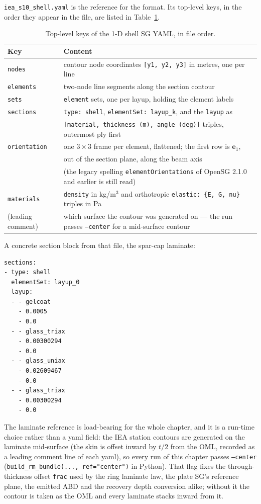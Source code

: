 \texttt{iea\_s10\_shell.yaml} is the reference for the format. Its top-level
keys, in the order they appear in the file, are listed in
Table~\ref{tab:windio:yamlkeys}.

\begin{table}[htbp]
\centering
\small
\caption{Top-level keys of the 1-D shell SG YAML, in file order.}
\label{tab:windio:yamlkeys}
\begin{tabular}{ll}
\toprule
Key & Content \\
\midrule
\texttt{nodes} & contour node coordinates \texttt{[y1, y2, y3]} in metres, one per line \\
\texttt{elements} & two-node line segments along the section contour \\
\texttt{sets} & \texttt{element} sets, one per layup, holding the element labels \\
\texttt{sections} & \texttt{type: shell}, \texttt{elementSet: layup\_k}, and the \texttt{layup} as \\
  & \texttt{[material, thickness (m), angle (deg)]} triples, outermost ply first \\
\texttt{orientation} & one $3\times3$ frame per element, flattened; the first row is $\mathbf{e}_1$, \\
  & out of the section plane, along the beam axis \\
  & (the legacy spelling \texttt{elementOrientations} of OpenSG 2.1.0 and earlier is still read) \\
\texttt{materials} & \texttt{density} in kg/m$^3$ and orthotropic \texttt{elastic: \{E, G, nu\}} triples in Pa \\
(leading comment) & which surface the contour was generated on --- the run passes \texttt{--center} for a mid-surface contour \\
\bottomrule
\end{tabular}
\end{table}

A concrete section block from that file, the spar-cap laminate:

\begin{lstlisting}[style=shellst]
sections:
- type: shell
  elementSet: layup_0
  layup:
  - - gelcoat
    - 0.0005
    - 0.0
  - - glass_triax
    - 0.00300294
    - 0.0
  - - glass_uniax
    - 0.02609467
    - 0.0
  - - glass_triax
    - 0.00300294
    - 0.0
\end{lstlisting}

The laminate reference is load-bearing for the whole chapter, and it is a
run-time choice rather than a yaml field: the IEA station contours are
generated on the laminate mid-surface (the skin is offset inward by $t/2$
from the OML, recorded as a leading comment line of each yaml), so every run
of this chapter passes \texttt{--center} (\texttt{build\_rm\_bundle(...,
ref="center")} in Python). That flag fixes the through-thickness offset
\texttt{frac} used by the ring laminate law, the plate SG's reference plane,
the emitted ABD and the recovery depth conversion alike; without it the
contour is taken as the OML and every laminate stacks inward from it.

